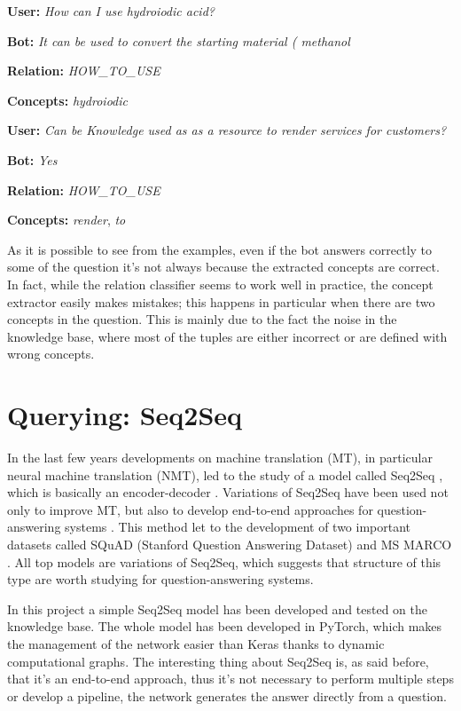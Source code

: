 \documentclass[paper=a4, fontsize=11pt]{scrartcl} %
\numberwithin{equation}{section} %
\numberwithin{figure}{section} %
\numberwithin{table}{section} %
\theoremstyle{definition}
\begin{document}
\textbf{User:} \textit{How can I use hydroiodic acid?}

\textbf{Bot:} \textit{It can be used to convert the starting material ( methanol}

\textbf{Relation:} \textit{HOW\_TO\_USE}

\textbf{Concepts:} \textit{hydroiodic}

\textbf{User:} \textit{Can be Knowledge used as as a resource to render services for customers?}

\textbf{Bot:} \textit{Yes}

\textbf{Relation:} \textit{HOW\_TO\_USE}

\textbf{Concepts:} \textit{render}, \textit{to}

As it is possible to see from the examples, even if the bot answers correctly
to some of the question it's not always because the extracted concepts are
correct. In fact, while the relation classifier seems to work well in practice,
the concept extractor easily makes mistakes; this happens in particular when there are two
concepts in the question. This is mainly due to the fact the noise in the
knowledge base, where most of the tuples are either incorrect or are defined
with wrong concepts.


\section{Querying: Seq2Seq}
\label{section:querying-seq2seq}

In the last few years developments on machine translation (MT), in particular 
neural machine translation (NMT),
led to the study of a model called Seq2Seq \cite{Sutskever:2014:SSL:2969033.2969173},
which is basically an encoder-decoder \cite{cho-al-emnlp14}.
Variations of Seq2Seq have been used not only to improve MT, but also to develop
end-to-end approaches for question-answering systems \cite{journals/corr/VinyalsL15}.
This method let to the development of two important datasets called SQuAD
(Stanford Question Answering Dataset) \cite{squad-2016}
and MS MARCO \cite{DBLP:conf/nips/NguyenRSGTMD16}. All top models are variations
of Seq2Seq, which suggests that structure of this type are worth studying for
question-answering systems.

In this project a simple Seq2Seq model has been developed and tested on the
knowledge base. The whole model has been
developed in PyTorch, which makes the management of the network easier than
Keras thanks to dynamic computational graphs. The interesting thing about
Seq2Seq is, as said before, that it's an end-to-end approach, thus it's not necessary to perform
multiple steps or develop a pipeline, the network generates the answer directly
from a question.
\end{document}
